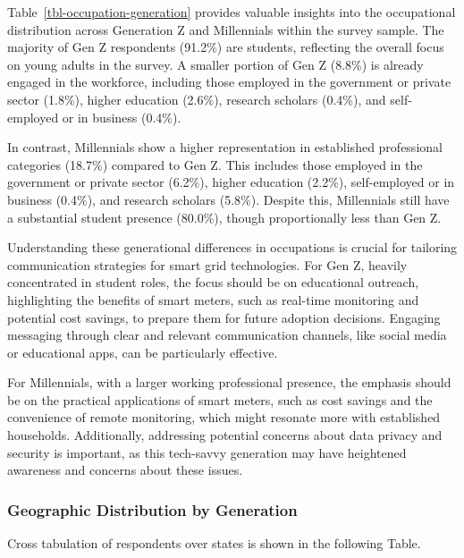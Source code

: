 \documentclass[
  letterpaper,
  DIV=11,
  numbers=noendperiod]{scrartcl}
\begin{document}
Table~\ref{tbl-occupation-generation} provides valuable insights into
the occupational distribution across Generation Z and Millennials within
the survey sample. The majority of Gen Z respondents (91.2\%) are
students, reflecting the overall focus on young adults in the survey. A
smaller portion of Gen Z (8.8\%) is already engaged in the workforce,
including those employed in the government or private sector (1.8\%),
higher education (2.6\%), research scholars (0.4\%), and self-employed
or in business (0.4\%).

In contrast, Millennials show a higher representation in established
professional categories (18.7\%) compared to Gen Z. This includes those
employed in the government or private sector (6.2\%), higher education
(2.2\%), self-employed or in business (0.4\%), and research scholars
(5.8\%). Despite this, Millennials still have a substantial student
presence (80.0\%), though proportionally less than Gen Z.

Understanding these generational differences in occupations is crucial
for tailoring communication strategies for smart grid technologies. For
Gen Z, heavily concentrated in student roles, the focus should be on
educational outreach, highlighting the benefits of smart meters, such as
real-time monitoring and potential cost savings, to prepare them for
future adoption decisions. Engaging messaging through clear and relevant
communication channels, like social media or educational apps, can be
particularly effective.

For Millennials, with a larger working professional presence, the
emphasis should be on the practical applications of smart meters, such
as cost savings and the convenience of remote monitoring, which might
resonate more with established households. Additionally, addressing
potential concerns about data privacy and security is important, as this
tech-savvy generation may have heightened awareness and concerns about
these issues.

\subsubsection{Geographic Distribution by
Generation}\label{geographic-distribution-by-generation}

Cross tabulation of respondents over states is shown in the following
Table.
\end{document}
